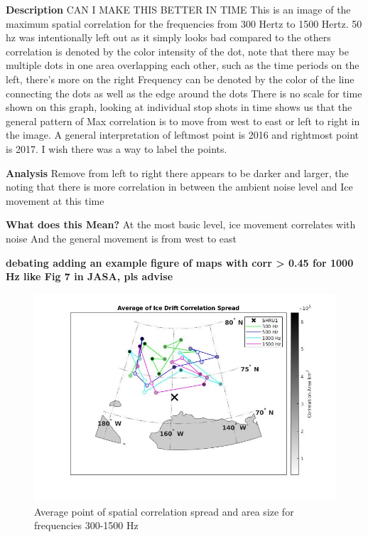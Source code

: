 \textbf{Description}
CAN I MAKE THIS BETTER IN TIME
This is an image of the  maximum spatial correlation for the frequencies from 300 Hertz to 1500 Hertz. 50 hz was intentionally left out as it simply looks bad compared to the others
correlation is denoted by the color intensity of the dot, note that there may be multiple dots in one area overlapping each other, such as the time periods on the left, there's more on the right
Frequency can be denoted by the color of the line connecting the dots as well as the edge around the dots
There is no scale for time shown on this graph, looking at individual stop shots in time shows us that the general pattern of Max correlation is to move from west to east or left to right in the image. A general interpretation of leftmost point is 2016 and rightmost point is 2017. I wish there was a way to label the points.  

\textbf{Analysis}
Remove from left to right there appears to be darker and larger, the noting that there is more correlation in between the ambient noise level and Ice movement at this time

\textbf{What does this Mean?}
At the most basic level, ice movement correlates with noise
And the general movement is from west to east

\textbf{debating adding an example figure of maps with corr > 0.45 for 1000 Hz like Fig 7 in JASA, pls advise}

\begin{figure}[h]
\centering
\includegraphics[scale=0.5]{Figures/avg_map_grayscale.jpg}
\caption{Average point of spatial correlation spread and area size for frequencies 300-1500 Hz}
\label{fig_maxcorr_location}
\end{figure}

